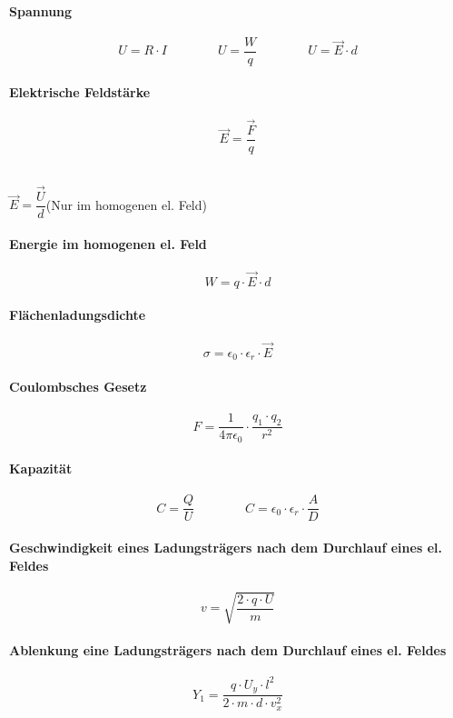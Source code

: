 \documentclass[a4paper]{article}
\begin{document}
\paragraph{Spannung}
\large$$U = R \cdot I \qquad \qquad U = \dfrac{W}{q} \qquad \qquad U = \vec{E} \cdot d$$\normalsize
	
\paragraph{Elektrische Feldstärke}
\large$$\vec{E} = \dfrac{\vec{F}}{q}$$\normalsize \\
\begin{center}
	\large$\vec{E} = \dfrac{\vec{U}}{d}$\qquad \small(Nur im homogenen el. Feld)\normalsize
\end{center}
 

\paragraph{Energie im homogenen el. Feld}
\large$$W = q \cdot \vec{E} \cdot d$$\normalsize

\paragraph{Flächenladungsdichte}
\large$$\sigma = \epsilon_0 \cdot \epsilon_r \cdot \vec{E}$$\normalsize

\paragraph{Coulombsches Gesetz}
\large$$F = \dfrac{1}{4 \pi \epsilon_0} \cdot \dfrac{q_1 \cdot q_2}{r^2}$$\normalsize

\paragraph{Kapazität}
\large$$C = \dfrac{Q}{U} \qquad\qquad C = \epsilon_0 \cdot \epsilon_r \cdot \dfrac{A}{D}$$\normalsize

\paragraph{Geschwindigkeit eines Ladungsträgers nach dem Durchlauf eines el. Feldes}
\large$$v = \sqrt{\dfrac{2 \cdot q \cdot U}{m}}$$\normalsize

\paragraph{Ablenkung eine Ladungsträgers nach dem Durchlauf eines el. Feldes}
\large$$Y_1 = \dfrac{q \cdot U_y \cdot l^2}{2 \cdot m \cdot d \cdot v_x ^2}$$\normalsize
\end{document}
